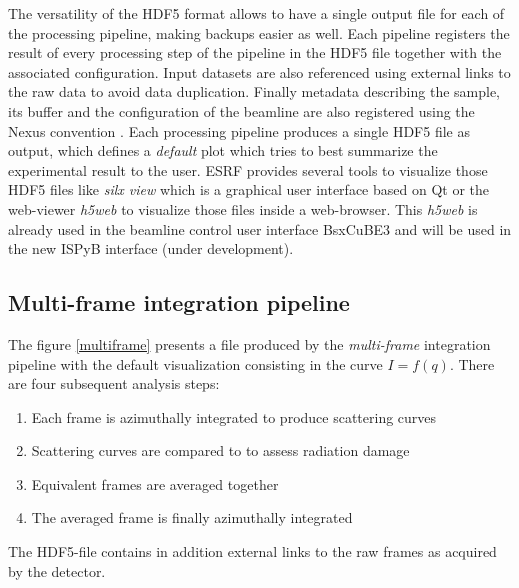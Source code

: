 \documentclass[preprint]{iucr}              %
\begin{document}
The versatility of the HDF5 format allows to have a single output file for each of the processing pipeline, making backups easier as well. 
Each pipeline registers the result of every processing step of the pipeline in the HDF5 file together with the associated configuration.
Input datasets are also referenced using external links to the raw data to avoid data duplication. 
Finally metadata describing the sample, its buffer and the configuration of the beamline are also registered using the Nexus convention \cite{nexus}.
Each processing pipeline produces a single HDF5 file as output, which defines a \textit{default} plot which tries to best summarize the experimental result to the user.
ESRF provides several tools to visualize those HDF5 files like \textit{silx view} \cite{silx} which is a graphical user interface based on Qt \cite{pyqt} or the web-viewer \textit{h5web} \cite{h5web} to visualize those files inside a web-browser.
This \textit{h5web} is already used in the beamline control user interface BsxCuBE3 \cite{bm29_2022} and will be used in the new ISPyB interface (under development).

\subsection{Multi-frame integration pipeline}
\label{multiframe_pipeline}
The figure \ref{multiframe} presents a file produced by the \textit{multi-frame} integration pipeline with the default visualization consisting in the curve $I = f(q)$. 
There are four subsequent analysis steps:
\begin{enumerate}
\item Each frame is azimuthally integrated to produce scattering curves
\item Scattering curves are compared to to assess radiation damage
\item Equivalent frames are averaged together
\item The averaged frame is finally azimuthally integrated
\end{enumerate}
The HDF5-file contains in addition external links to the raw frames as acquired by the detector.
\end{document}
